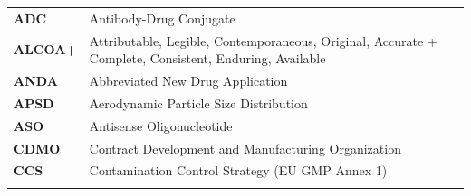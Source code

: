 \documentclass[
  11pt,
  a4paper,
]{report}
\begin{document}
\begin{longtable}[]{@{}ll@{}}
\begin{minipage}[t]{0.33\columnwidth}
\textbf{ADC}\strut
\end{minipage} & \begin{minipage}[t]{0.61\columnwidth}\raggedright
Antibody-Drug Conjugate\strut
\end{minipage}\tabularnewline
\begin{minipage}[t]{0.33\columnwidth}\raggedright
\textbf{ALCOA+}\strut
\end{minipage} & \begin{minipage}[t]{0.61\columnwidth}\raggedright
Attributable, Legible, Contemporaneous, Original, Accurate + Complete,
Consistent, Enduring, Available\strut
\end{minipage}\tabularnewline
\begin{minipage}[t]{0.33\columnwidth}\raggedright
\textbf{ANDA}\strut
\end{minipage} & \begin{minipage}[t]{0.61\columnwidth}\raggedright
Abbreviated New Drug Application\strut
\end{minipage}\tabularnewline
\begin{minipage}[t]{0.33\columnwidth}\raggedright
\textbf{APSD}\strut
\end{minipage} & \begin{minipage}[t]{0.61\columnwidth}\raggedright
Aerodynamic Particle Size Distribution\strut
\end{minipage}\tabularnewline
\begin{minipage}[t]{0.33\columnwidth}\raggedright
\textbf{ASO}\strut
\end{minipage} & \begin{minipage}[t]{0.61\columnwidth}\raggedright
Antisense Oligonucleotide\strut
\end{minipage}\tabularnewline
\begin{minipage}[t]{0.33\columnwidth}\raggedright
\textbf{CDMO}\strut
\end{minipage} & \begin{minipage}[t]{0.61\columnwidth}\raggedright
Contract Development and Manufacturing Organization\strut
\end{minipage}\tabularnewline
\begin{minipage}[t]{0.33\columnwidth}\raggedright
\textbf{CCS}\strut
\end{minipage} & \begin{minipage}[t]{0.61\columnwidth}\raggedright
Contamination Control Strategy (EU GMP Annex 1)\strut
\end{minipage}\tabularnewline
\begin{minipage}[t]{0.33\columnwidth}\raggedright

\end{minipage}
\end{longtable}
\end{document}
